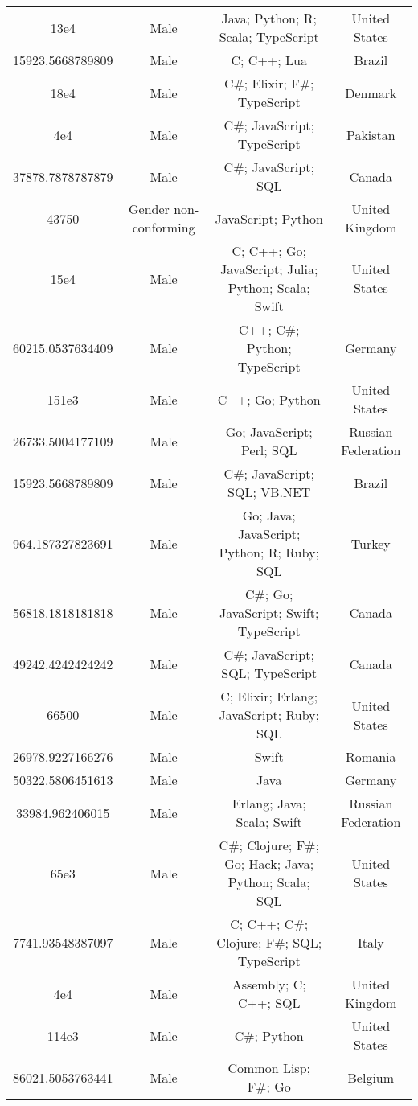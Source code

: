\begin{center}
\begin{tabular}{ |c|c|c|c| }
13e4  &  Male  &  Java; Python; R; Scala; TypeScript  &  United States  \\ 
15923.5668789809  &  Male  &  C; C++; Lua  &  Brazil  \\ 
18e4  &  Male  &  C\#; Elixir; F\#; TypeScript  &  Denmark  \\ 
4e4  &  Male  &  C\#; JavaScript; TypeScript  &  Pakistan  \\ 
37878.7878787879  &  Male  &  C\#; JavaScript; SQL  &  Canada  \\ 
43750  &  Gender non-conforming  &  JavaScript; Python  &  United Kingdom  \\ 
15e4  &  Male  &  C; C++; Go; JavaScript; Julia; Python; Scala; Swift  &  United States  \\ 
60215.0537634409  &  Male  &  C++; C\#; Python; TypeScript  &  Germany  \\ 
151e3  &  Male  &  C++; Go; Python  &  United States  \\ 
26733.5004177109  &  Male  &  Go; JavaScript; Perl; SQL  &  Russian Federation  \\ 
15923.5668789809  &  Male  &  C\#; JavaScript; SQL; VB.NET  &  Brazil  \\ 
964.187327823691  &  Male  &  Go; Java; JavaScript; Python; R; Ruby; SQL  &  Turkey  \\ 
56818.1818181818  &  Male  &  C\#; Go; JavaScript; Swift; TypeScript  &  Canada  \\ 
49242.4242424242  &  Male  &  C\#; JavaScript; SQL; TypeScript  &  Canada  \\ 
66500  &  Male  &  C; Elixir; Erlang; JavaScript; Ruby; SQL  &  United States  \\ 
26978.9227166276  &  Male  &  Swift  &  Romania  \\ 
50322.5806451613  &  Male  &  Java  &  Germany  \\ 
33984.962406015  &  Male  &  Erlang; Java; Scala; Swift  &  Russian Federation  \\ 
65e3  &  Male  &  C\#; Clojure; F\#; Go; Hack; Java; Python; Scala; SQL  &  United States  \\ 
7741.93548387097  &  Male  &  C; C++; C\#; Clojure; F\#; SQL; TypeScript  &  Italy  \\ 
4e4  &  Male  &  Assembly; C; C++; SQL  &  United Kingdom  \\ 
114e3  &  Male  &  C\#; Python  &  United States  \\ 
86021.5053763441  &  Male  &  Common Lisp; F\#; Go  &  Belgium  \\ 

\end{tabular}
\end{center}
